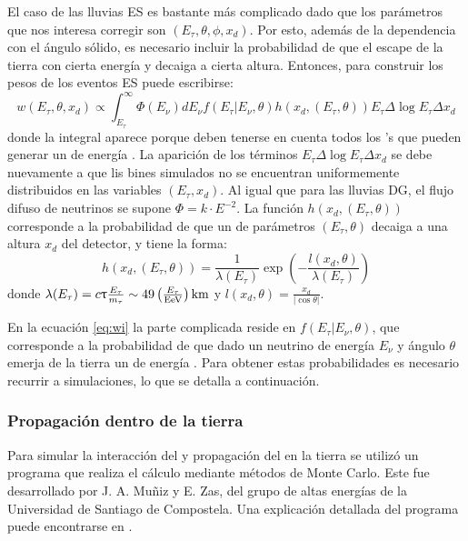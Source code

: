 		El caso de las lluvias ES es bastante más complicado dado que los parámetros que nos interesa corregir son $(E_\tau,\theta,\phi,x_d)$.
		Por esto, además de la dependencia con el ángulo sólido, es necesario incluir la probabilidad de que el \tauon{} escape de la tierra con cierta energía y decaiga a cierta altura.
		Entonces, para construir los pesos de los eventos ES puede escribirse:
		\begin{equation}
		 w(E_\tau,\theta,x_d) \propto \int_{E_\tau}^\infty \Phi(E_\nu)dE_\nu f(E_\tau|E_\nu,\theta) h(x_d,(E_\tau,\theta)) E_\tau \Delta\log E_\tau \Delta x_d
		 \label{eq:wi}
		\end{equation}
		donde la integral aparece porque deben tenerse en cuenta todos los \nutau{}'s que pueden generar un \tauon{} de energía \etau{}.
		La aparición de los términos $E_\tau \Delta\log E_\tau \Delta x_d$ se debe nuevamente a que lis bines simulados no se encuentran uniformemente distribuidos en las variables $(E_\tau,x_d)$.
		Al igual que para las lluvias DG, el flujo difuso de neutrinos se supone $\Phi=k\cdot E^{-2}$.
		La función $h(x_d,(E_\tau,\theta))$ corresponde a la probabilidad de que un \tauon{} de parámetros $(E_\tau,\theta)$ decaiga a una altura $x_d$ del detector, y tiene la forma:
		\begin{equation}
		 h(x_d,(E_\tau,\theta))=\frac{1}{\lambda(E_\tau)}
		 \exp{\left(
		 -\frac{l(x_d,\theta)}{\lambda(E_\tau)}
		 \right)}
		\end{equation}
		donde $\lambda(E_\tau)=c\uptau\frac{E_\tau}{m_\tau}\sim49\left(\frac{E_\tau}{\rm EeV}\right){\rm km}$ y $l(x_d,\theta)=\frac{x_d}{|\cos\theta|}$.
		
		En la ecuación \ref{eq:wi} la parte complicada reside en $f(E_\tau|E_\nu,\theta)$, que corresponde a la probabilidad de que dado un neutrino de energía $E_\nu$ y ángulo $\theta$ emerja de la tierra un \tauon{} de energía \etau{}.
		Para obtener estas probabilidades es necesario recurrir a simulaciones, lo que se detalla a continuación.
		
		\subsubsection{\label{sbsbsc:sim_prop_tierra}Propagaci\'on dentro de la tierra}
	
		Para simular la interacción del \nutau{} y propagaci\'on del \tauon{} en la tierra se utiliz\'o un programa que realiza el c\'alculo mediante m\'etodos de Monte Carlo. Este fue desarrollado por J. A. Mu\~niz y E. Zas, del grupo de altas energ\'ias de la Universidad de Santiago de Compostela.
		Una explicaci\'on detallada del programa puede encontrarse en \cite{gap_tau_tierra}.
		
